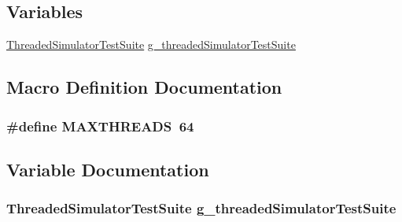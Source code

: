 \subsection*{Variables}
\begin{DoxyCompactItemize}
\item 
\hyperlink{classThreadedSimulatorTestSuite}{Threaded\+Simulator\+Test\+Suite} \hyperlink{threaded-test-suite_8cc_abcd24cc3373208012356789af8c7be5a}{g\+\_\+threaded\+Simulator\+Test\+Suite}
\end{DoxyCompactItemize}


\subsection{Macro Definition Documentation}
\subsubsection[{\texorpdfstring{M\+A\+X\+T\+H\+R\+E\+A\+DS}{MAXTHREADS}}]{\setlength{\rightskip}{0pt plus 5cm}\#define M\+A\+X\+T\+H\+R\+E\+A\+DS~64}\hypertarget{threaded-test-suite_8cc_ab9eade334fd8a98c128802aec7e9191c}{}\label{threaded-test-suite_8cc_ab9eade334fd8a98c128802aec7e9191c}


\subsection{Variable Documentation}
\subsubsection[{\texorpdfstring{g\+\_\+threaded\+Simulator\+Test\+Suite}{g_threadedSimulatorTestSuite}}]{\setlength{\rightskip}{0pt plus 5cm} {\bf Threaded\+Simulator\+Test\+Suite}  g\+\_\+threaded\+Simulator\+Test\+Suite}\hypertarget{threaded-test-suite_8cc_abcd24cc3373208012356789af8c7be5a}{}\label{threaded-test-suite_8cc_abcd24cc3373208012356789af8c7be5a}
